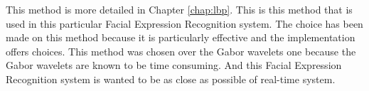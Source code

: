 \noindent This method is more detailed in Chapter \ref{chap:lbp}. This is this method that is used in this particular Facial Expression Recognition system. The choice has been made on this method because it is particularly effective and the implementation offers choices. This method was chosen over the Gabor wavelets one because the Gabor wavelets are known to be time consuming. And this Facial Expression Recognition system is wanted to be as close as possible of real-time system.
\newline

